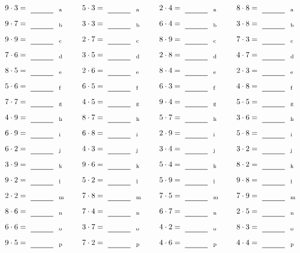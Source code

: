 \documentclass
[
  draft    = true,
  fontsize = 11pt,
  parskip  = half-
]
{scrartcl}
\begin{document}
\par\vfill\par
\begin{align*}
    \pline{9\cdot3}&=\rline{a}
  & \pline{5\cdot3}&=\rline{a}
  & \pline{2\cdot4}&=\rline{a}
  & \pline{8\cdot8}&=\rline{a} \\[1ex]
    \pline{9\cdot7}&=\rline{b}
  & \pline{3\cdot3}&=\rline{b}
  & \pline{6\cdot4}&=\rline{b}
  & \pline{3\cdot8}&=\rline{b} \\[1ex]
    \pline{9\cdot9}&=\rline{c}
  & \pline{2\cdot7}&=\rline{c}
  & \pline{8\cdot9}&=\rline{c}
  & \pline{7\cdot3}&=\rline{c} \\[1ex]
    \pline{7\cdot6}&=\rline{d}
  & \pline{3\cdot5}&=\rline{d}
  & \pline{2\cdot8}&=\rline{d}
  & \pline{4\cdot7}&=\rline{d} \\[1ex]
    \pline{8\cdot5}&=\rline{e}
  & \pline{2\cdot6}&=\rline{e}
  & \pline{8\cdot4}&=\rline{e}
  & \pline{2\cdot3}&=\rline{e} \\[1ex]
    \pline{5\cdot6}&=\rline{f}
  & \pline{6\cdot5}&=\rline{f}
  & \pline{6\cdot3}&=\rline{f}
  & \pline{4\cdot8}&=\rline{f} \\[1ex]
    \pline{7\cdot7}&=\rline{g}
  & \pline{4\cdot5}&=\rline{g}
  & \pline{9\cdot4}&=\rline{g}
  & \pline{5\cdot5}&=\rline{g} \\[1ex]
    \pline{4\cdot9}&=\rline{h}
  & \pline{8\cdot7}&=\rline{h}
  & \pline{5\cdot7}&=\rline{h}
  & \pline{3\cdot6}&=\rline{h} \\[1ex]
    \pline{6\cdot9}&=\rline{i}
  & \pline{6\cdot8}&=\rline{i}
  & \pline{2\cdot9}&=\rline{i}
  & \pline{5\cdot8}&=\rline{i} \\[1ex]
    \pline{6\cdot2}&=\rline{j}
  & \pline{4\cdot3}&=\rline{j}
  & \pline{3\cdot4}&=\rline{j}
  & \pline{3\cdot2}&=\rline{j} \\[1ex]
    \pline{3\cdot9}&=\rline{k}
  & \pline{9\cdot6}&=\rline{k}
  & \pline{5\cdot4}&=\rline{k}
  & \pline{8\cdot2}&=\rline{k} \\[1ex]
    \pline{9\cdot2}&=\rline{l}
  & \pline{5\cdot2}&=\rline{l}
  & \pline{5\cdot9}&=\rline{l}
  & \pline{9\cdot8}&=\rline{l} \\[1ex]
    \pline{2\cdot2}&=\rline{m}
  & \pline{7\cdot8}&=\rline{m}
  & \pline{7\cdot5}&=\rline{m}
  & \pline{7\cdot9}&=\rline{m} \\[1ex]
    \pline{8\cdot6}&=\rline{n}
  & \pline{7\cdot4}&=\rline{n}
  & \pline{6\cdot7}&=\rline{n}
  & \pline{2\cdot5}&=\rline{n} \\[1ex]
    \pline{6\cdot6}&=\rline{o}
  & \pline{3\cdot7}&=\rline{o}
  & \pline{4\cdot2}&=\rline{o}
  & \pline{8\cdot3}&=\rline{o} \\[1ex]
    \pline{9\cdot5}&=\rline{p}
  & \pline{7\cdot2}&=\rline{p}
  & \pline{4\cdot6}&=\rline{p}
  & \pline{4\cdot4}&=\rline{p}
\end{align*}
\end{document}
